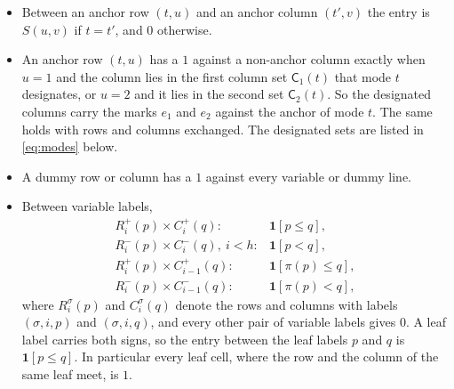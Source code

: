 \documentclass{article}
\theoremstyle{plain}
\theoremstyle{definition}
\begin{document}
\begin{itemize}\itemsep1pt
\item Between an anchor row $(t,u)$ and an anchor column $(t',v)$ the entry is $S(u,v)$ if $t=t'$,
and $0$ otherwise.
\item An anchor row $(t,u)$ has a $1$ against a non-anchor column exactly when $u=1$ and the column
lies in the first column set $\mathsf C_1(t)$ that mode $t$ designates, or $u=2$ and it lies in the
second set $\mathsf C_2(t)$. So the designated columns carry the marks $e_1$ and $e_2$ against the
anchor of mode $t$. The same holds with rows and columns exchanged. The designated sets are listed
in \eqref{eq:modes} below.
\item A dummy row or column has a $1$ against every variable or dummy line.
\item Between variable labels,
\[
\begin{array}{ll}
  R_i^+(p)\times C_i^+(q)\colon & \mathbf 1[p\le q],\\
  R_i^-(p)\times C_i^-(q),\ i<h\colon & \mathbf 1[p<q],\\
  R_i^+(p)\times C_{i-1}^+(q)\colon & \mathbf 1[\pi(p)\le q],\\
  R_i^-(p)\times C_{i-1}^-(q)\colon & \mathbf 1[\pi(p)<q],
\end{array}
\]
where $R_i^\sigma(p)$ and $C_i^\sigma(q)$ denote the rows and columns with labels $(\sigma,i,p)$ and
$(\sigma,i,q)$, and every other pair of variable labels gives $0$. A leaf label carries both signs,
so the entry between the leaf labels $p$ and $q$ is $\mathbf 1[p\le q]$. In particular every leaf
cell, where the row and the column of the same leaf meet, is $1$.
\end{itemize}
\end{document}
